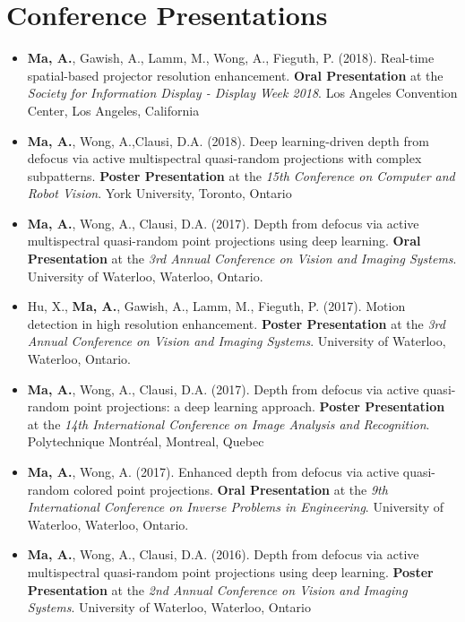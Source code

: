\section*{Conference Presentations}
\vspace{\postsubhead}
\begin{adjustwidth}{\indentleft}{\indentright}
 \begin{itemize}
    \setlength\itemsep{0.5em}

    \item \textbf{Ma, A.}, Gawish, A., Lamm, M., Wong, A., Fieguth, P. (2018). Real-time spatial-based projector resolution enhancement. \textbf{Oral Presentation} at the \emph{Society for Information Display - Display Week 2018}. Los Angeles Convention Center, Los Angeles, California
    
    \item \textbf{Ma, A.}, Wong, A.,Clausi, D.A. (2018). Deep learning-driven depth from defocus via active multispectral quasi-random projections with complex subpatterns. \textbf{Poster Presentation} at the \emph{15th Conference on Computer and Robot Vision}. York University, Toronto, Ontario
            
    \item \textbf{Ma, A.}, Wong, A., Clausi, D.A. (2017). Depth from defocus via active multispectral quasi-random point projections using deep learning. \textbf{Oral Presentation} at the \emph{3rd Annual Conference on Vision and Imaging Systems}. University of Waterloo, Waterloo, Ontario.
    
    \item Hu, X., \textbf{Ma, A.}, Gawish, A., Lamm, M., Fieguth, P. (2017). Motion detection in high resolution enhancement. \textbf{Poster Presentation} at the \emph{3rd Annual Conference on Vision and Imaging Systems}. University of Waterloo, Waterloo, Ontario.
    
    \item \textbf{Ma, A.}, Wong, A., Clausi, D.A. (2017). Depth from defocus via active quasi-random point projections: a deep learning approach. \textbf{Poster Presentation} at the \emph{14th International Conference on Image Analysis and Recognition}. Polytechnique Montréal, Montreal, Quebec
    
    \item \textbf{Ma, A.}, Wong, A. (2017). Enhanced depth from defocus via active quasi-random colored point projections. \textbf{Oral Presentation} at the \emph{9th International Conference on Inverse Problems in Engineering}. University of Waterloo, Waterloo, Ontario.
    
    \item \textbf{Ma, A.}, Wong, A., Clausi, D.A. (2016). Depth from defocus via active multispectral quasi-random point projections using deep learning. \textbf{Poster Presentation} at the \emph{2nd Annual Conference on Vision and Imaging Systems}. University of Waterloo, Waterloo, Ontario
\end{itemize}
\end{adjustwidth}
